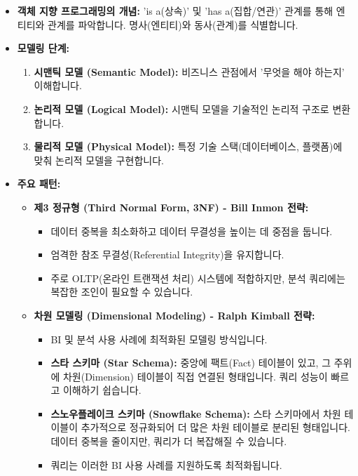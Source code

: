\documentclass[11pt,a4paper]{article}
\theoremstyle{definition}
\begin{document}
\begin{itemize}
    \item \textbf{객체 지향 프로그래밍의 개념:} 'is a(상속)' 및 'has a(집합/연관)' 관계를 통해 엔티티와 관계를 파악합니다. 명사(엔티티)와 동사(관계)를 식별합니다.
    \item \textbf{모델링 단계:}
    \begin{enumerate}
        \item \textbf{시맨틱 모델 (Semantic Model):} 비즈니스 관점에서 '무엇을 해야 하는지' 이해합니다.
        \item \textbf{논리적 모델 (Logical Model):} 시맨틱 모델을 기술적인 논리적 구조로 변환합니다.
        \item \textbf{물리적 모델 (Physical Model):} 특정 기술 스택(데이터베이스, 플랫폼)에 맞춰 논리적 모델을 구현합니다.
    \end{enumerate}
    \item \textbf{주요 패턴:}
    \begin{itemize}
        \item \textbf{제3 정규형 (Third Normal Form, 3NF) - Bill Inmon 전략:}
        \begin{itemize}
            \item 데이터 중복을 최소화하고 데이터 무결성을 높이는 데 중점을 둡니다.
            \item 엄격한 참조 무결성(Referential Integrity)을 유지합니다.
            \item 주로 OLTP(온라인 트랜잭션 처리) 시스템에 적합하지만, 분석 쿼리에는 복잡한 조인이 필요할 수 있습니다.
        \end{itemize}
        \item \textbf{차원 모델링 (Dimensional Modeling) - Ralph Kimball 전략:}
        \begin{itemize}
            \item BI 및 분석 사용 사례에 최적화된 모델링 방식입니다.
            \item \textbf{스타 스키마 (Star Schema):} 중앙에 팩트(Fact) 테이블이 있고, 그 주위에 차원(Dimension) 테이블이 직접 연결된 형태입니다. 쿼리 성능이 빠르고 이해하기 쉽습니다.
            \item \textbf{스노우플레이크 스키마 (Snowflake Schema):} 스타 스키마에서 차원 테이블이 추가적으로 정규화되어 더 많은 차원 테이블로 분리된 형태입니다. 데이터 중복을 줄이지만, 쿼리가 더 복잡해질 수 있습니다.
            \item 쿼리는 이러한 BI 사용 사례를 지원하도록 최적화됩니다.
        \end{itemize}

\end{itemize}
\end{itemize}
\end{document}
